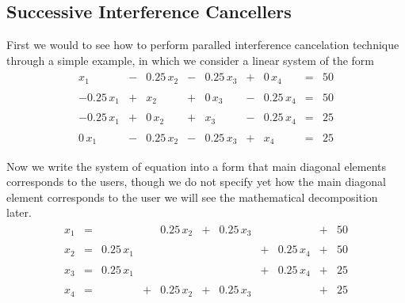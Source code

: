 \subsection{Successive Interference Cancellers}
First we would to see how to perform paralled interference cancelation technique through a simple example, in which we consider a linear system of the form
\begin{eqnarray}
\begin{array}{rrrrrrrrr}
x_1          &-& 0.25\,x_2   &-& 0.25\,x_3   &+& 0\,x_4      &=& 50 \\ \\

-0.25\,x_1   &+& x_2         &+& 0\,x_3      &-& 0.25\,x_4   &=& 50 \\ \\

-0.25\,x_1   &+& 0\,x_2      &+& x_3         &-& 0.25\,x_4   &=& 25 \\ \\             
	     
0\,x_1	     &-& 0.25\,x_2   &-& 0.25\,x_3   &+& x_4         &=& 25 \\ \\ 
\end{array}
\end{eqnarray}
Now we write the system of equation into a form that main diagonal elements corresponds to the users, though we do not specify yet how the main diagonal element corresponds to the user we will see the mathematical decomposition later.
\begin{eqnarray}
\begin{array}{rrrrrrrrrrr}
x_1          &=&             & & 0.25\,x_2   &+& 0.25\,x_3   &&              &+& 50 \\ \\

x_2          &=& 0.25\,x_1   & &             & &             &+& 0.25\,x_4   &+& 50 \\ \\

x_3          &=& 0.25\,x_1   & &             & &             &+& 0.25\,x_4   &+& 25 \\ \\             
	     
x_4          &=& 	     &+& 0.25\,x_2   &+& 0.25\,x_3   & &             &+& 25 \\ \\ 
\end{array}
\end{eqnarray}
